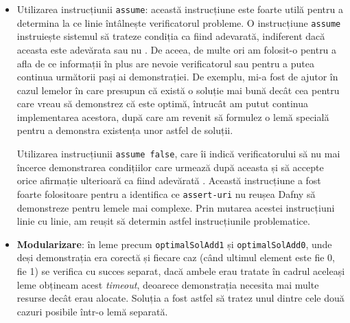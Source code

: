 \begin{sloppypar}
\begin{itemize}
\begin{Verbatim}[commandchars=\\\{\}]
\PY{p}{\PYZob{}}
  \PY{n}{optimalSolRemove1}\PY{p}{(}\PY{n}{p}\PY{p}{,} \PY{n}{x}\PY{p}{,} \PY{n}{i}\PY{p}{,} \PY{n}{j}\PY{p}{)}\PY{p}{;}
  \PY{k}{assert} \PY{n}{isOptimalPartialSolution}\PY{p}{(}\PY{n}{p}\PY{p}{,} \PY{n}{x}\PY{p}{[}\PY{p}{..}\PY{n}{i} \PY{o}{\PYZhy{}} \PY{l+m+mi}{1}\PY{p}{]}\PY{p}{,} 
    \PY{n}{i} \PY{o}{\PYZhy{}} \PY{l+m+mi}{1}\PY{p}{,} \PY{n}{j} \PY{o}{\PYZhy{}} \PY{n}{p}\PY{p}{.}\PY{n}{weights}\PY{p}{[}\PY{n}{i} \PY{o}{\PYZhy{}} \PY{l+m+mi}{1}\PY{p}{]}\PY{p}{)}\PY{p}{;}
\PY{p}{\PYZcb{}} 
\end{Verbatim}
    \item Utilizarea instrucțiunii \texttt{assume}: această instrucțiune este foarte utilă pentru a determina la ce linie întâlnește verificatorul probleme. O instrucțiune \texttt{assume} instruiește sistemul să trateze condiția ca fiind adevarată, indiferent dacă aceasta este adevărata sau nu \cite{leino2021dafny}. De aceea, de multe ori am folosit-o pentru a afla de ce informații în plus are nevoie verificatorul sau pentru a putea continua următorii pași ai demonstrației. De exemplu, mi-a fost de ajutor în cazul lemelor în care presupun că există o soluție mai bună decât cea pentru care vreau să demonstrez că este optimă, întrucât am putut continua implementarea acestora, după care am revenit să formulez o lemă specială pentru a demonstra existența unor astfel de soluții. \par
    \hspace{3mm} Utilizarea instrucțiunii \texttt{assume false}, care îi indică verificatorului să nu mai încerce demonstrarea condițiilor care urmează după aceasta și să accepte orice afirmație ulterioară ca fiind adevărată \cite{leino2021dafny}. Această instrucțiune a fost foarte folositoare pentru a identifica ce \texttt{assert-uri} nu reușea Dafny să demonstreze pentru lemele mai complexe. Prin mutarea acestei instrucțiuni linie cu linie, am reușit să determin astfel instrucțiunile problematice.
    \item \textbf{Modularizare}: în leme precum \texttt{optimalSolAdd1} și \texttt{optimalSolAdd0}, unde deși demonstrația era corectă și fiecare caz (când ultimul element este fie 0, fie 1) se verifica cu succes separat, dacă ambele erau tratate în cadrul aceleași leme obțineam acest \emph{timeout}, deoarece demonstrația necesita mai multe resurse decât erau alocate. Soluția a fost astfel să tratez unul dintre cele două cazuri posibile într-o lemă separată.
\end{itemize}

\end{sloppypar}
